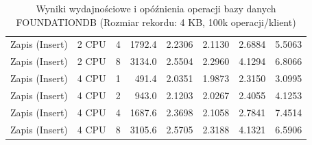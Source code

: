 \begin{table}[ht]
{\begin{tabular}{llcrrrrr}
Zapis (Insert) & 2 CPU & 4 & 1792.4 & 2.2306 & 2.1130 & 2.6884 & 5.5063 \\
Zapis (Insert) & 2 CPU & 8 & 3134.0 & 2.5504 & 2.2960 & 4.1294 & 6.8066 \\
Zapis (Insert) & 4 CPU & 1 & 491.4 & 2.0351 & 1.9873 & 2.3150 & 3.0995 \\
Zapis (Insert) & 4 CPU & 2 & 943.0 & 2.1203 & 2.0267 & 2.4055 & 4.1253 \\
Zapis (Insert) & 4 CPU & 4 & 1687.6 & 2.3698 & 2.1058 & 2.7841 & 7.4514 \\
Zapis (Insert) & 4 CPU & 8 & 3105.6 & 2.5705 & 2.3188 & 4.1321 & 6.5906 \\
\bottomrule
\end{tabular}%
}
\caption{Wyniki wydajnościowe i opóźnienia operacji bazy danych FOUNDATIONDB (Rozmiar rekordu: 4 KB, 100k operacji/klient)}
\label{tab:latency_foundationdb_medium_100000}
\end{table}

